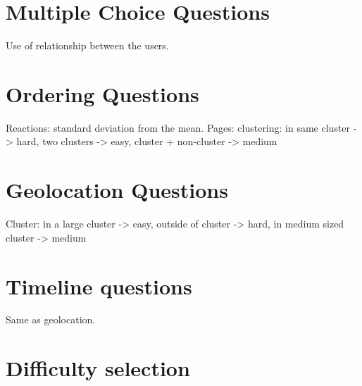 \section{Multiple Choice Questions}
Use of relationship between the users.
\section{Ordering Questions}
Reactions: standard deviation from the mean.
Pages: clustering: in same cluster -> hard, two clusters -> easy, cluster + non-cluster -> medium
\section{Geolocation Questions}
Cluster: in a large cluster -> easy, outside of cluster -> hard, in medium sized cluster -> medium
\section{Timeline questions}
Same as geolocation.
\section{Difficulty selection}